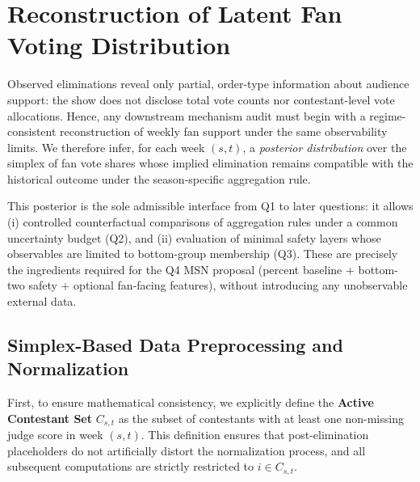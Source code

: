 
\section{\textbf{Reconstruction of Latent Fan Voting Distribution }  }
\label{sec:q1}

Observed eliminations reveal only partial, order-type information about audience support: the show does not disclose total vote counts nor contestant-level vote allocations. Hence, any downstream mechanism audit must begin with a regime-consistent reconstruction of weekly fan support under the same observability limits. We therefore infer, for each week $(s,t)$, a \emph{posterior distribution} over the simplex of fan vote shares whose implied elimination remains compatible with the historical outcome under the season-specific aggregation rule.

This posterior is the sole admissible interface from Q1 to later questions: it allows (i) controlled counterfactual comparisons of aggregation rules under a common uncertainty budget (Q2), and (ii) evaluation of minimal safety layers whose observables are limited to bottom-group membership (Q3). These are precisely the ingredients required for the Q4 MSN proposal (percent baseline + bottom-two safety + optional fan-facing features), without introducing any unobservable external data.

\subsection{Simplex-Based Data Preprocessing and Normalization }
\label{sec:q1_data}

First, to ensure mathematical consistency, we explicitly define the \textbf{Active Contestant Set} $C_{s,t}$ as the subset of contestants with at least one non-missing judge score in week $(s,t)$. This definition ensures that post-elimination placeholders do not artificially distort the normalization process, and all subsequent computations are strictly restricted to $i \in C_{s,t}$.

